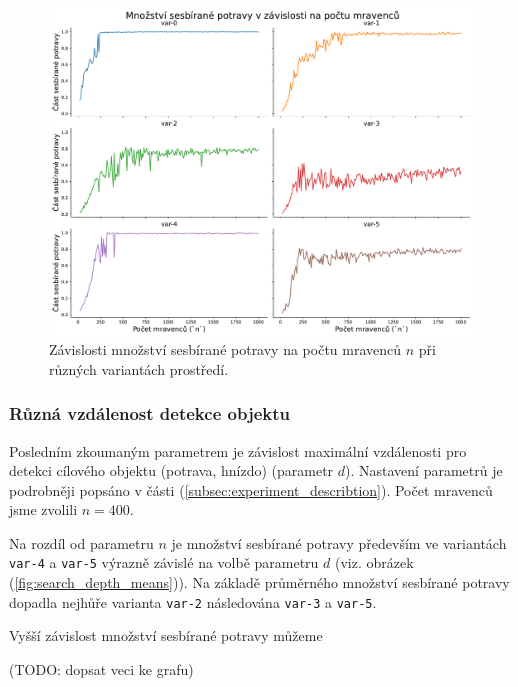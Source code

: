 \documentclass[10pt,a4paper,twocolumn]{article}
\begin{document}
\begin{figure}[tb]
  \centering
  \includegraphics[width=0.98\linewidth]{images/num_ants_variants_separated.pdf}
  \caption{Závislosti množství sesbírané potravy na počtu 
  mravenců $n$ při různých variantách prostředí.}
  \label{fig:num_ants_separated}
\end{figure}



\subsubsection{Různá vzdálenost detekce objektu}

Posledním zkoumaným parametrem je závislost maximální vzdálenosti
pro detekci cílového objektu (potrava, hnízdo) (parametr $d$).
Nastavení parametrů je podrobněji popsáno v části 
(\ref{subsec:experiment_describtion}). Počet mravenců jsme zvolili 
$n=400$.

Na rozdíl od parametru $n$ je množství sesbírané potravy především
ve variantách \texttt{var-4} a \texttt{var-5} výrazně závislé na
volbě parametru $d$ (viz. obrázek (\ref{fig:search_depth_means})).
Na základě průměrného množství sesbírané potravy dopadla nejhůře
varianta \texttt{var-2} následována \texttt{var-3} a \texttt{var-5}.

Vyšší závislost množství sesbírané potravy můžeme 

(TODO: dopsat veci ke grafu)



\end{document}
